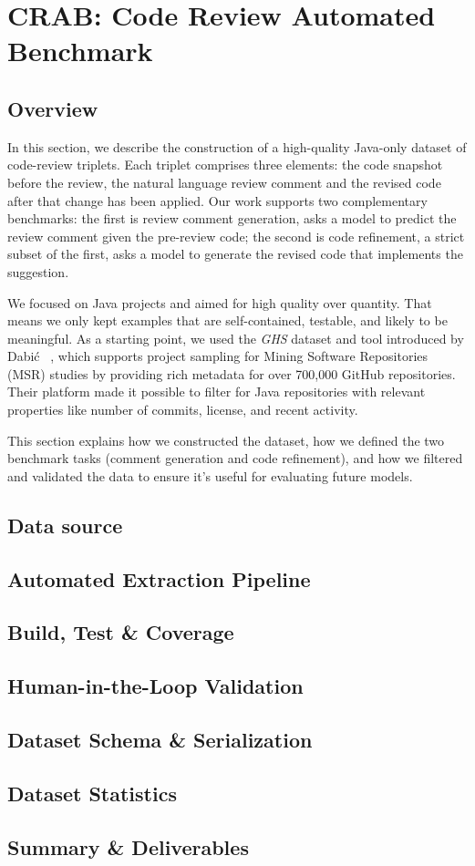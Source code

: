\section{CRAB: Code Review Automated Benchmark}

\subsection{Overview}

In this section, we describe the construction of a high-quality Java-only dataset of code-review
triplets. Each triplet comprises three elements: the code snapshot before the review, the natural
language review comment and the revised code after that change has been applied. Our work supports
two complementary benchmarks: the first is review comment generation, asks a model to predict the
review comment given the pre-review code; the second is code refinement, a strict subset of the
first, asks a model to generate the revised code that implements the suggestion.


We focused on Java projects and aimed for high quality over quantity. That means we only kept
examples that are self-contained, testable, and likely to be meaningful. As a starting point, we
used the \textit{GHS} dataset and tool introduced by Dabić \etal~\cite{Dabic:msr2021data}, which
supports project sampling for Mining Software Repositories (MSR) studies by providing rich metadata
for over 700,000 GitHub repositories. Their platform made it possible to filter for Java
repositories with relevant properties like number of commits, license, and recent activity.

This section explains how we constructed the dataset, how we defined the two benchmark tasks
(comment generation and code refinement), and how we filtered and validated the data to ensure it’s
useful for evaluating future models.


\subsection{Data source}
\subsection{Automated Extraction Pipeline}
\subsection{Build, Test \& Coverage}
\subsection{Human-in-the-Loop Validation}
\subsection{Dataset Schema \& Serialization}
\subsection{Dataset Statistics}
\subsection{Summary \& Deliverables}
